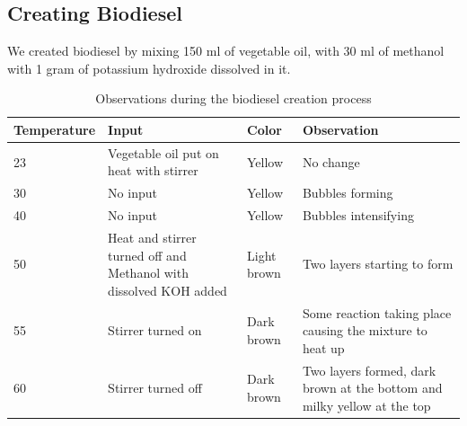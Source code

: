 \documentclass[a4paper, 12pt, english]{article}
\begin{document}
\subsection{Creating Biodiesel}
We created biodiesel by mixing 150 ml of vegetable oil, with 30 ml of methanol
with 1 gram of potassium hydroxide dissolved in it.

\begin{table}[H]
	\centering
	\begin{tabular}{|l|p{5cm}|l|p{5cm}|}
		\toprule
		\textbf{Temperature} & \textbf{Input}                                                    & \textbf{Color} & \textbf{Observation}                                                    \\ \midrule
		23                   & Vegetable oil put on heat with stirrer                            & Yellow         & No change                                                               \\ \bottomrule
		30                   & No input                                                          & Yellow         & Bubbles forming                                                         \\ \bottomrule
		40                   & No input                                                          & Yellow         & Bubbles intensifying                                                    \\ \bottomrule
		50                   & Heat and stirrer turned off and Methanol with dissolved KOH added & Light brown    & Two layers starting to form                                             \\ \bottomrule
		55                   & Stirrer turned on                                                 & Dark brown     & Some reaction taking place causing the mixture to heat up               \\ \bottomrule
		60                   & Stirrer turned off                                                & Dark brown     & Two layers formed, dark brown at the bottom and milky yellow at the top \\ \bottomrule

	\end{tabular}
	\caption{Observations during the biodiesel creation process}
\end{table}
\end{document}
